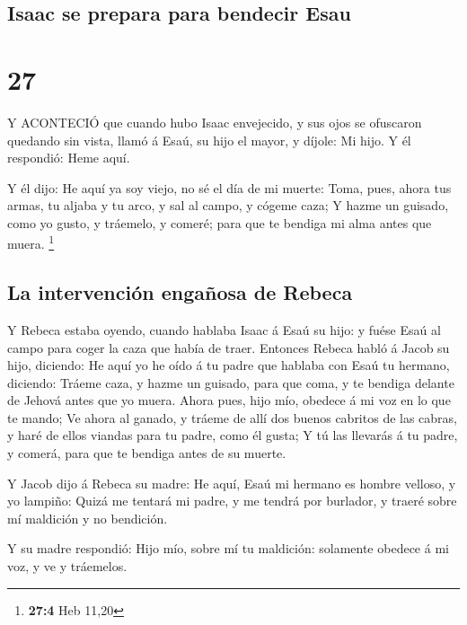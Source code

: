 \hypertarget{isaac-se-prepara-para-bendecir-esau}{%
\subsection{Isaac se prepara para bendecir
Esau}\label{isaac-se-prepara-para-bendecir-esau}}

\hypertarget{section-26}{%
\section{27}\label{section-26}}

 Y ACONTECIÓ que cuando hubo Isaac envejecido, y sus ojos se
ofuscaron quedando sin vista, llamó á Esaú, su hijo el mayor, y díjole:
Mi hijo. Y él respondió: Heme aquí.

 Y él dijo: He aquí ya soy viejo, no sé el día de mi muerte:
 Toma, pues, ahora tus armas, tu aljaba y tu arco, y sal al
campo, y cógeme caza;  Y hazme un guisado, como yo gusto, y
tráemelo, y comeré; para que te bendiga mi alma antes que muera.
\footnote{\textbf{27:4} Heb 11,20}

\hypertarget{la-intervenciuxf3n-engauxf1osa-de-rebeca}{%
\subsection{La intervención engañosa de
Rebeca}\label{la-intervenciuxf3n-engauxf1osa-de-rebeca}}

 Y Rebeca estaba oyendo, cuando hablaba Isaac á Esaú su
hijo: y fuése Esaú al campo para coger la caza que había de traer.
 Entonces Rebeca habló á Jacob su hijo, diciendo: He aquí yo
he oído á tu padre que hablaba con Esaú tu hermano, diciendo:
 Tráeme caza, y hazme un guisado, para que coma, y te
bendiga delante de Jehová antes que yo muera.  Ahora pues,
hijo mío, obedece á mi voz en lo que te mando;  Ve ahora al
ganado, y tráeme de allí dos buenos cabritos de las cabras, y haré de
ellos viandas para tu padre, como él gusta;  Y tú las
llevarás á tu padre, y comerá, para que te bendiga antes de su muerte.

 Y Jacob dijo á Rebeca su madre: He aquí, Esaú mi hermano
es hombre velloso, y yo lampiño:  Quizá me tentará mi
padre, y me tendrá por burlador, y traeré sobre mí maldición y no
bendición.

 Y su madre respondió: Hijo mío, sobre mí tu maldición:
solamente obedece á mi voz, y ve y tráemelos.

